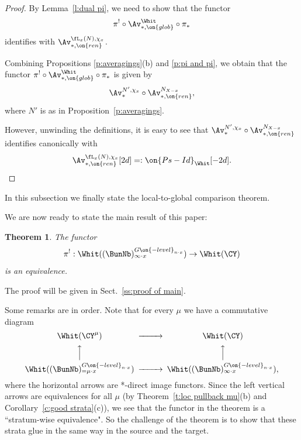 \documentclass[9pt]{amsart}
\newtheorem{thm}[subsubsection]{Theorem}
\theoremstyle{definition}
\theoremstyle{remark}
\newcommand{\thmref}[1]{Theorem~\ref{#1}}
\newcommand{\secref}[1]{Sect.~\ref{#1}}
\newcommand{\lemref}[1]{Lemma~\ref{#1}}
\newcommand{\propref}[1]{Proposition~\ref{#1}}
\newcommand{\corref}[1]{Corollary~\ref{#1}}
\numberwithin{equation}{section}
\begin{document}
\begin{proof}

By \lemref{l:dual pi}, we need to show that the functor
$$\pi^!\circ \Av_{*,\on{glob}}^{\Whit}\circ \pi_*$$
identifies with $\Av_{*,\on{ren}}^{\fL_x(N),\chi_x}$. 

\medskip

Combining Propositions \ref{p:averagings}(b) and \ref{p:pi and pi}, we obtain that the functor $\pi^!\circ \Av_{*,\on{glob}}^{\Whit}\circ \pi_*$
is given by
$$\Av^{N',\chi_x}_*\circ \Av_{*,\on{ren}}^{N_{X-x}},$$
where $N'$ is as in \propref{p:averagings}. 

\medskip

However, unwinding the definitions, it is easy to see that $\Av^{N',\chi_x}_*\circ \Av_{*,\on{ren}}^{N_{X-x}}$ 
identifies canonically with 
$$\Av_{*,\on{ren}}^{\fL_x(N),\chi_x}[2d]=:\on{Ps-Id}_{\Whit}[-2d].$$

\end{proof} 


In this subsection we finally state the local-to-global comparison theorem. 

\sssec{}

We are now ready to state the main result of this paper:

\begin{thm}  \label{t:main}
The functor 
$$\pi^!:\Whit((\BunNb)^{G\on{-level}_{n\cdot x}}_{\infty\cdot x})\to \Whit(\CY)$$
is an equivalence.
\end{thm}

The proof will be given in \secref{ss:proof of main}.

\sssec{}  \label{sss:ff enough}

Some remarks are in order. Note that for every $\mu$ we have a commutative diagram
$$
\CD
\Whit(\CY^\mu) @>>> \Whit(\CY) \\
@AAA   @AAA   \\
\Whit((\BunNb)^{G\on{-level}_{n\cdot x}}_{=\mu\cdot x})  @>>>  \Whit((\BunNb)^{G\on{-level}_{n\cdot x}}_{\infty\cdot x}),
\endCD
$$ 
where the horizontal arrows are *-direct image functors. Since the left vertical arrows are equivalences for all $\mu$ 
(by \thmref{t:loc pullback mu}(b) and \corref{c:good strata}(c)), we see that the functor in the theorem is a ``stratum-wise equivalence". 
So the challenge of the theorem is to show that these strata glue in the same way in the source and the target.
\end{document}
